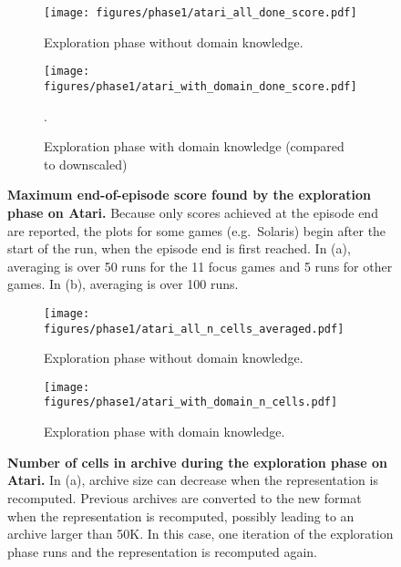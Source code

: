 \documentclass{nature}
\begin{document}
\begin{figure}[ht!]
        \centering
        \begin{subfigure}[]{0.95\textwidth}
            \centering
            \texttt{[image: figures/phase1/atari\_all\_done\_score.pdf]}
            \caption{Exploration phase without domain knowledge.}
        \end{subfigure}
        \begin{subfigure}[]{\textwidth}
            \centering
            \texttt{[image: figures/phase1/atari\_with\_domain\_done\_score.pdf]}
            \caption{Exploration phase with domain knowledge (compared to downscaled)}.
        \end{subfigure}
        \caption{\textbf{Maximum end-of-episode score found by the exploration phase on Atari.} Because only scores achieved at the episode end are reported, the plots for some games (e.g.~Solaris) begin after the start of the run, when the episode end is first reached. In (a), averaging is over 50 runs for the 11 focus games and 5 runs for other games. In (b), averaging is over 100 runs.}
    \label{efig:phase1_atari_score}
\end{figure}

\begin{figure}[ht!]
        \centering
        \begin{subfigure}[]{0.95\textwidth}
            \centering
            \texttt{[image: figures/phase1/atari\_all\_n\_cells\_averaged.pdf]}
            \caption{Exploration phase without domain knowledge.}
        \end{subfigure}
        \begin{subfigure}[]{\textwidth}
            \centering
            \texttt{[image: figures/phase1/atari\_with\_domain\_n\_cells.pdf]}
            \caption{Exploration phase with domain knowledge.}
        \end{subfigure}
        \caption{\textbf{Number of cells in archive during the exploration phase on Atari.} In (a), archive size can decrease when the representation is recomputed. Previous archives are converted to the new format when the representation is recomputed, possibly leading to an archive larger than 50K. In this case, one iteration of the exploration phase runs and the representation is recomputed again.}
    \label{efig:phase1_atari_cells}
\end{figure}
\end{document}
